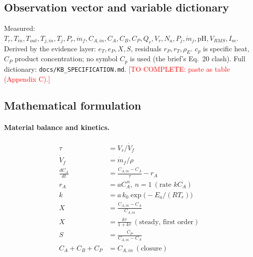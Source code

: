 \documentclass[11pt,a4paper]{article}
\newcommand{\TODO}[1]{\textcolor{red}{[TO COMPLETE: #1]}}
\begin{document}
\subsection{Observation vector and variable dictionary}
Measured: $T_r,T_{in},T_{out},T_{j,in},T_j,P_r,\dot m_f,C_{A,in},C_A,C_B,C_P,Q_r,V_r,N_a,P_j,\dot m_j,\mathrm{pH},V_{RMS},I_m$. Derived by the evidence layer: $e_T,e_P,X,S$, residuals $r_P,r_T,\rho_E$. $c_p$ is specific heat, $C_P$ product concentration; no symbol $C_p$ is used (the brief's Eq.~20 clash). Full dictionary: \texttt{docs/KB\_SPECIFICATION.md}. \TODO{paste as table (Appendix C).}
\subsection{Mathematical formulation}
\paragraph{Material balance and kinetics.}
\begin{align}
\tau&=V_r/\dot V_f\\ \dot V_f&=\dot m_f/\rho\\ \frac{dC_A}{dt}&=\frac{C_{A,in}-C_A}{\tau}-r_A\\ r_A&=aC_A^{\,n},\ n=1\ (\text{rate } k C_A)\\ k&=a\,k_0\exp\!\big(-E_a/(RT_r)\big)\\ X&=\frac{C_{A,in}-C_A}{C_{A,in}}\\ X&=\frac{k\tau}{1+k\tau}\ (\text{steady, first order})\\ S&=\frac{C_P}{C_{A,in}-C_A}\\ C_A+C_B+C_P&=C_{A,in}\ (\text{closure})
\end{align}
\end{document}
